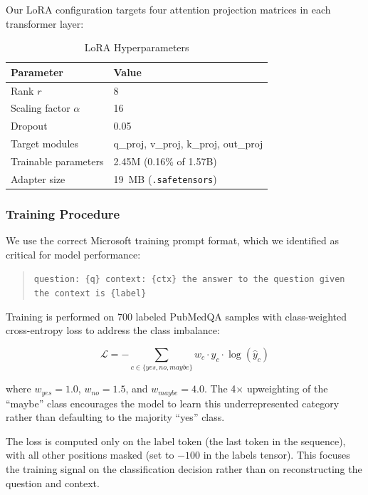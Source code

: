 \documentclass[conference]{IEEEtran}
\begin{document}
Our LoRA configuration targets four attention projection matrices in each transformer layer:

\begin{table}[h]
\centering
\caption{LoRA Hyperparameters}
\label{tab:lora_config}
\begin{tabular}{ll}
\toprule
\textbf{Parameter} & \textbf{Value} \\
\midrule
Rank $r$ & 8 \\
Scaling factor $\alpha$ & 16 \\
Dropout & 0.05 \\
Target modules & q\_proj, v\_proj, k\_proj, out\_proj \\
Trainable parameters & 2.45M (0.16\% of 1.57B) \\
Adapter size & 19~MB (\texttt{.safetensors}) \\
\bottomrule
\end{tabular}
\end{table}

\subsubsection{Training Procedure}

We use the correct Microsoft training prompt format, which we identified as critical for model performance:

\begin{quote}
\small
\texttt{question: \{q\} context: \{ctx\} the answer to the question given the context is \{label\}}
\end{quote}

Training is performed on 700 labeled PubMedQA samples with class-weighted cross-entropy loss to address the class imbalance:

\begin{equation}
    \mathcal{L} = -\sum_{c \in \{yes, no, maybe\}} w_c \cdot y_c \cdot \log(\hat{y}_c)
\end{equation}

where $w_{yes} = 1.0$, $w_{no} = 1.5$, and $w_{maybe} = 4.0$. The 4$\times$ upweighting of the ``maybe'' class encourages the model to learn this underrepresented category rather than defaulting to the majority ``yes'' class.

The loss is computed only on the label token (the last token in the sequence), with all other positions masked (set to $-100$ in the labels tensor). This focuses the training signal on the classification decision rather than on reconstructing the question and context.
\end{document}
